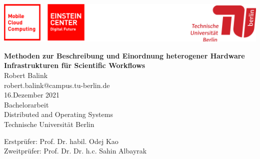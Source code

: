 
\thispagestyle{empty}

\includegraphics[width=\linewidth]{fig/Logo_Header}
\mbox{}\\[1pc]
\begin{center}
    \huge{ \bfseries Methoden zur Beschreibung und Einordnung heterogener Hardware Infrastrukturen für Scientific Workflows}\\[2pc]

    \Large{Robert Balink}\\
    \large{robert.balink@campus.tu-berlin.de }\\[1pc]
    \large{16.Dezember 2021}\\[2pc]

    Bachelorarbeit\\
    Distributed and Operating Systems\\
    Technische Universität Berlin
\end{center}
\vfill

Erstprüfer:    Prof. Dr. habil. Odej Kao
\hfill{}\\
Zweitprüfer: Prof. Dr. Dr. h.c. Sahin Albayrak

\afterpage{\null\thispagestyle{empty}\newpage}

